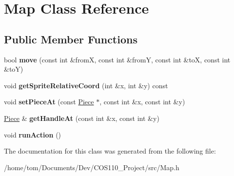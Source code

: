 \hypertarget{classMap}{\section{Map Class Reference}
\label{classMap}
}
\subsection*{Public Member Functions}
\begin{DoxyCompactItemize}
\item 
\hypertarget{classMap_a69c9a3943d42cf80c8c30f9deb4a005c}{bool {\bfseries move} (const int \&from\-X, const int \&from\-Y, const int \&to\-X, const int \&to\-Y)}\label{classMap_a69c9a3943d42cf80c8c30f9deb4a005c}

\item 
\hypertarget{classMap_a0fe1ddd2dafee9300357235e371fb58f}{void {\bfseries get\-Sprite\-Relative\-Coord} (int \&x, int \&y) const }\label{classMap_a0fe1ddd2dafee9300357235e371fb58f}

\item 
\hypertarget{classMap_a89ce533c9916dcfe795268e862d2cd47}{void {\bfseries set\-Piece\-At} (const \hyperlink{classPiece}{Piece} $\ast$, const int \&x, const int \&y)}\label{classMap_a89ce533c9916dcfe795268e862d2cd47}

\item 
\hypertarget{classMap_abc61a6ff624751ee05d5537d68f497d7}{\hyperlink{classPiece}{Piece} \& {\bfseries get\-Handle\-At} (const int \&x, const int \&y)}\label{classMap_abc61a6ff624751ee05d5537d68f497d7}

\item 
\hypertarget{classMap_ab1478fe29ce5286ab5dabf134c9ea050}{void {\bfseries run\-Action} ()}\label{classMap_ab1478fe29ce5286ab5dabf134c9ea050}

\end{DoxyCompactItemize}


The documentation for this class was generated from the following file\-:\begin{DoxyCompactItemize}
\item 
/home/tom/\-Documents/\-Dev/\-C\-O\-S110\-\_\-\-Project/src/Map.\-h\end{DoxyCompactItemize}
